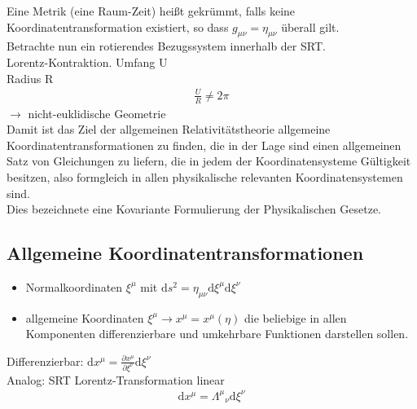 \documentclass[a4paper]{article}
\begin{document}
Eine Metrik (eine Raum-Zeit) heißt gekrümmt, falls keine
Koordinatentransformation existiert, so dass
$g_{\mu\nu}=\eta_{\mu\nu}$ überall gilt.\\
Betrachte nun ein rotierendes Bezugssystem innerhalb der SRT.\\
Lorentz-Kontraktion.
Umfang U\\
Radius R\\
\begin{align}
\frac{U}{R}\neq2\pi
\end{align}
$\rightarrow$ nicht-euklidische Geometrie\\
Damit ist das Ziel der allgemeinen Relativitätstheorie allgemeine
Koordinatentransformationen zu finden, die in der Lage sind einen allgemeinen
Satz von Gleichungen zu liefern, die in jedem der Koordinatensysteme Gültigkeit
besitzen, also formgleich in allen physikalische relevanten Koordinatensystemen
sind.\\
Dies bezeichnete eine Kovariante Formulierung der Physikalischen Gesetze.
\subsection{Allgemeine Koordinatentransformationen}
\begin{itemize}
  \item Normalkoordinaten $\xi^\mu$ mit $\mathrm{d}s^2=\eta_{\mu\nu}\mathrm{d}
\xi^\mu\mathrm{d}\xi^\nu$ 
\item allgemeine Koordinaten $\xi^\mu\rightarrow x^\mu=x^\mu(\eta)$ die
beliebige in allen Komponenten differenzierbare und umkehrbare Funktionen
darstellen sollen.   
\end{itemize}
Differenzierbar: $\mathrm{d}x^\mu=\frac{\partial x^\mu}{\partial
\xi^\nu}\mathrm{d}\xi^\nu$\\
Analog: SRT Lorentz-Transformation linear
\begin{align}
\mathrm{d}x^\mu=\Lambda^\mu{}_\nu \mathrm{d}\xi^\nu
\end{align}
\end{document}
